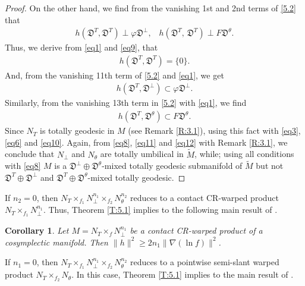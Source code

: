 \documentclass[reqno]{amsart}
\theoremstyle{plain}
\newtheorem{corollary}{Corollary}[section]
\theoremstyle{remark}
\numberwithin{equation}{section}
\def\e{\eqref}
\def\e{\eqref}
\begin{document}
\begin{proof}
On the other hand, we find from the vanishing 1st and 2nd terms of \e{5.2} that
\begin{align}\label{eq9}
h({\mathfrak{D}^{T}}, {\mathfrak{D}^{T}})\perp\varphi{\mathfrak{D}}^\perp,\,\,\,\,\,h({\mathfrak{D}^{T}},\, {\mathfrak{D}^{T}})\perp F{\mathfrak{D}}^\theta.
\end{align}
Thus,  we derive from \eqref{eq1} and \eqref{eq9}, that
\begin{align}\label{eq10}
h({\mathfrak{D}^{T}}, {\mathfrak{D}^{T}})=\{0\}.
\end{align}
And, from the vanishing 11th term of \eqref{5.2} and \eqref{eq1}, we get
\begin{align}\label{eq11}
h({\mathfrak{D}^{T}}, {\mathfrak{D}}^\perp)\subset \varphi{\mathfrak{D}}^\perp.
\end{align}
Similarly, from the vanishing 13th term in \eqref{5.2} with \eqref{eq1}, we find
\begin{align}\label{eq12}
h({\mathfrak{D}^{T}}, {\mathfrak{D}}^\theta)\subset F{\mathfrak{D}}^\theta.
\end{align}
Since $N_T$ is totally geodesic in $M$ (see Remark \ref{R:3.1}), using this fact with \eqref{eq3}, \eqref{eq6} and \eqref{eq10}. Again, from \eqref{eq8}, \eqref{eq11} and \eqref{eq12} with Remark \ref{R:3.1}, we conclude that $N_\perp$ and $N_\theta$ are totally umbilical in $\widetilde M$, while; using all conditions with  \eqref{eq8} $M$ is a ${\mathfrak{D}}^\perp\oplus {\mathfrak{D}}^\theta$-mixed totally geodesic submanifold of $\widetilde M$ but not ${\mathfrak{D}^{T}}\oplus {\mathfrak{D}}^\perp$ and ${\mathfrak{D}^{T}}\oplus {\mathfrak{D}}^\theta$-mixed totally geodesic. 
\end{proof}

If $n_{2}=0$, then  $N_T\times_{f_1}N^{n_{1}}_\perp\times_{f_2}N^{n_{2}}_\theta$ reduces to a contact CR-warped product $N_T\times_{f_1}N^{n_{1}}_\perp$. Thus,
Theorem \ref{T:5.1} implies to the following main result of \cite{UA}.

\begin{corollary}\label{C:5.1}  Let $M=N_T\times_{f}N^{n_{1}}_\perp$ be a contact CR-warped product of a cosymplectic manifold. Then 
$\|h\|^2\geq2n_1\! \|\nabla(\ln f)\|^2$.
\end{corollary}

If $n_{1}=0$, then $N_T\times_{f_1}N^{n_{1}}_\perp\times_{f_2}N^{n_{2}}_\theta$ reduces to a pointwise semi-slant warped product $N_T\times_{f_{2}}N_\theta$. In this case,
Theorem \ref{T:5.1} implies to the main result of \cite{Park}.
\end{document}
